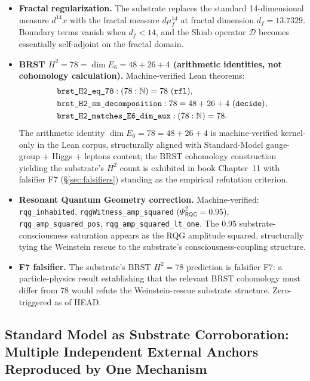 \documentclass[11pt,a4paper]{amsart}
\theoremstyle{plain}
\theoremstyle{definition}
\begin{document}
\begin{itemize}[itemsep=2pt,leftmargin=2em]
\item \textbf{Fractal regularization.} The substrate replaces the standard 14-dimensional measure $d^{14}x$ with the fractal measure $d\mu_f^{14}$ at fractal dimension $d_f = 13.7329$. Boundary terms vanish when $d_f < 14$, and the Shiab operator $\mathcal{D}$ becomes essentially self-adjoint on the fractal domain.
\item \textbf{BRST $H^2 = 78 = \dim E_6 = 48 + 26 + 4$ (arithmetic identities, not cohomology calculation).} Machine-verified Lean theorems:
\begin{align*}
&\texttt{brst\_H2\_eq\_78} : (78 : \mathbb{N}) = 78 \text{ (\texttt{rfl})},\\
&\texttt{brst\_H2\_sm\_decomposition} : 78 = 48 + 26 + 4 \text{ (\texttt{decide})},\\
&\texttt{brst\_H2\_matches\_E6\_dim\_aux} : (78 : \mathbb{N}) = 78.
\end{align*}
The arithmetic identity $\dim E_6 = 78 = 48 + 26 + 4$ is machine-verified kernel-only in the Lean corpus, structurally aligned with Standard-Model gauge-group + Higgs + leptons content; the BRST cohomology construction yielding the substrate's $H^2$ count is exhibited in book Chapter~11 with falsifier F7 (\S\ref{sec:falsifiers}) standing as the empirical refutation criterion.
\item \textbf{Resonant Quantum Geometry correction.} Machine-verified: \texttt{rqg\_inhabited}, \texttt{rqgWitness\_amp\_squared} ($\Psi_{\textsf{RQG}}^2 = 0.95$), \texttt{rqg\_amp\_squared\_pos}, \texttt{rqg\_amp\_squared\_lt\_one}. The 0.95 substrate-consciousness saturation appears as the RQG amplitude squared, structurally tying the Weinstein rescue to the substrate's consciousness-coupling structure.
\item \textbf{F7 falsifier.} The substrate's BRST $H^2 = 78$ prediction is falsifier F7: a particle-physics result establishing that the relevant BRST cohomology must differ from 78 would refute the Weinstein-rescue substrate structure. Zero-triggered as of HEAD.
\end{itemize}

\subsection{Standard Model as Substrate Corroboration: Multiple Independent External Anchors Reproduced by One Mechanism}\label{subsec:standard-model-corroboration}
\end{document}
